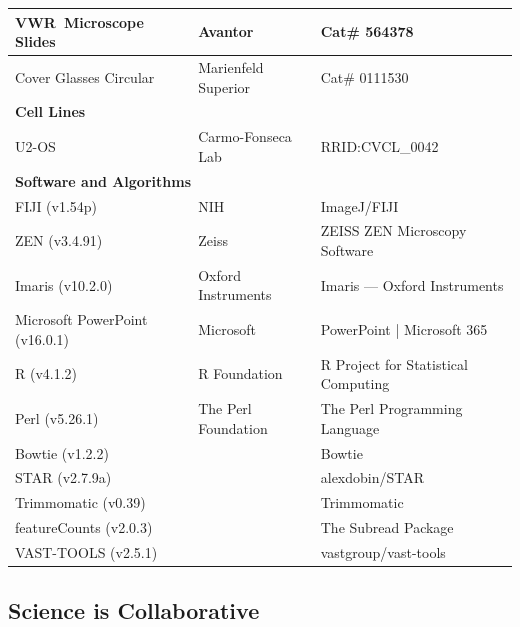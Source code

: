 \begin{table}[H]
\begin{tabular}{|p{0.50\resourcetablewidth}|p{0.25\resourcetablewidth}|p{0.25\resourcetablewidth}|}
		\hline
		VWR\textregistered~Microscope Slides & Avantor & Cat\# 564378 \\
		\hline
		Cover Glasses Circular & Marienfeld Superior & Cat\# 0111530 \\
		\hline
		\multicolumn{3}{|l|}{\textbf{Cell Lines}} \\
		\hline
		U2-OS & Carmo-Fonseca Lab & RRID:CVCL\_0042 \\
		\hline
		\multicolumn{3}{|l|}{\textbf{Software and Algorithms}} \\
		\hline
		FIJI (v1.54p) & NIH & ImageJ/FIJI \\
		\hline
		ZEN (v3.4.91) & Zeiss & ZEISS ZEN Microscopy Software \\
		\hline
		Imaris (v10.2.0) & Oxford Instruments & Imaris --- Oxford Instruments \\
		\hline
		Microsoft PowerPoint (v16.0.1) & Microsoft & PowerPoint | Microsoft 365 \\
		\hline
		R (v4.1.2) & R Foundation & R Project for Statistical Computing \\
		\hline
		Perl (v5.26.1) & The Perl Foundation & The Perl Programming Language \\
		\hline
		Bowtie (v1.2.2) & \cite{langmead_ultrafast_2009} & Bowtie \\
		\hline
		STAR (v2.7.9a) & \cite{dobin_star_2013} & alexdobin/STAR \\
		\hline
		Trimmomatic (v0.39) & \cite{bolger_trimmomatic_2014} & Trimmomatic \\
		\hline
		featureCounts (v2.0.3) & \cite{liao_featurecounts_2014} & The Subread Package \\
		\hline
		VAST-TOOLS (v2.5.1) & \cite{tapial_atlas_2017} & vastgroup/vast-tools \\
		\hline
	\end{tabular}
	\label{tab:keyresources}
\end{table}
\subsection{Science is Collaborative}

